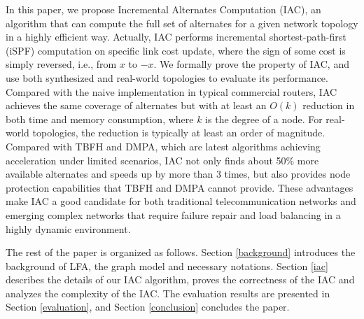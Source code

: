 In this paper, we propose Incremental Alternates Computation (IAC), an algorithm that can
compute the full set of alternates for a given network topology in a highly efficient way.
Actually, IAC performs incremental shortest-path-first (iSPF) computation on specific link
cost update,
where the sign of some cost is simply reversed, i.e., from $x$ to $-x$.
We formally prove the property of IAC,
and use both synthesized and real-world topologies to evaluate its performance.
Compared with the naive implementation in typical commercial routers, IAC achieves the same coverage of alternates but
with at least an $O(k)$ reduction in both time and memory consumption, where $k$ is the degree of a node. For real-world topologies, the reduction is typically at least an order of magnitude.
Compared with TBFH and DMPA, which are latest algorithms achieving acceleration under limited scenarios,
IAC not only finds about 50\% more available alternates and speeds up by more than 3 times,
but also provides node protection capabilities that TBFH and DMPA cannot provide.
These advantages make IAC a good candidate for both traditional telecommunication networks
and emerging complex networks that require failure repair and load balancing
in a highly dynamic environment.
\iffalse
Our contributions are summarized as follows:
\begin{itemize}
\item We propose an incremental alternates computation (IAC) algorithm based on iSPF, which can compute all the next hops satisfied DC rule. %
\item Theoretical analysis indicates that the computation complexity of IAC is less than that of constructing a shortest path tree and  can provide the same network availability as DC.
\item We propose an IAC algorithm which can  efficiently calculate
the minimum cost of all its neighbors to all other nodes of the
network on the shortest path tree rooted at the compute node. Therefore
IAC can completely and efficiently deal with LFA problem.
\item Theoretical analysis and experiments results indicate that IAC can provide the same network availability as LFA.
\end{itemize}
\fi

The rest of the paper is organized as follows.
Section \ref{background} introduces the background of LFA, the graph model and necessary notations. %
Section \ref{iac} describes the details of our IAC algorithm, proves the correctness of the IAC and analyzes the complexity of the IAC.
The evaluation results are
presented in Section \ref{evaluation}, and Section \ref{conclusion} concludes the paper.




